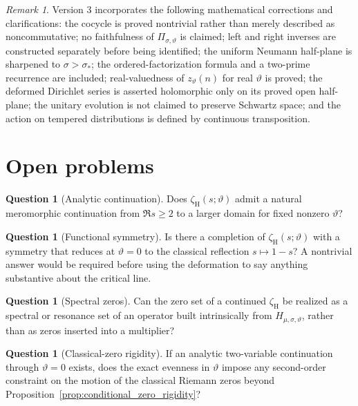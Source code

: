 \documentclass[11pt]{amsart}
\numberwithin{equation}{section}
\theoremstyle{plain}
\theoremstyle{definition}
\newtheorem{question}[theorem]{Question}
\theoremstyle{remark}
\newtheorem{remark}[theorem]{Remark}
\begin{document}
\begin{remark}
\label{rem:v2_audit_corrections}
Version 3 incorporates the following mathematical corrections and
clarifications: the cocycle is proved nontrivial rather than merely described
as noncommutative; no faithfulness of \(\Pi_{\sigma,\vartheta}\) is
claimed; left and right inverses are constructed separately before being
identified; the uniform Neumann half-plane is sharpened to
\(\sigma>\sigma_*\); the ordered-factorization formula and a two-prime
recurrence are included; real-valuedness of \(z_\vartheta(n)\) for real
\(\vartheta\) is proved; the deformed Dirichlet series is asserted
holomorphic only on its proved open half-plane; the unitary evolution is not
claimed to preserve Schwartz space; and the action on tempered distributions
is defined by continuous transposition.
\end{remark}

\section{Open problems}
\label{sec:open_problems}

\begin{question}[Analytic continuation]
\label{q:analytic_continuation}
Does $\zeta_{\mathrm H}(s;\vartheta)$ admit a natural meromorphic continuation
from $\Re s\ge2$ to a larger domain for fixed nonzero $\vartheta$?
\end{question}

\begin{question}[Functional symmetry]
\label{q:functional_symmetry}
Is there a completion of $\zeta_{\mathrm H}(s;\vartheta)$ with a symmetry
that reduces at $\vartheta=0$ to the classical reflection $s\mapsto1-s$?
A nontrivial answer would be required before using the deformation to say
anything substantive about the critical line.
\end{question}

\begin{question}[Spectral zeros]
\label{q:spectral_zeros}
Can the zero set of a continued $\zeta_{\mathrm H}$ be realized as a spectral
or resonance set of an operator built intrinsically from
$H_{\mu,\sigma,\vartheta}$, rather than as zeros inserted into a multiplier?
\end{question}

\begin{question}[Classical-zero rigidity]
\label{q:classical_zero_rigidity}
If an analytic two-variable continuation through $\vartheta=0$ exists, does
the exact evenness in $\vartheta$ impose any second-order constraint on the
motion of the classical Riemann zeros beyond
Proposition~\ref{prop:conditional_zero_rigidity}?
\end{question}
\end{document}
